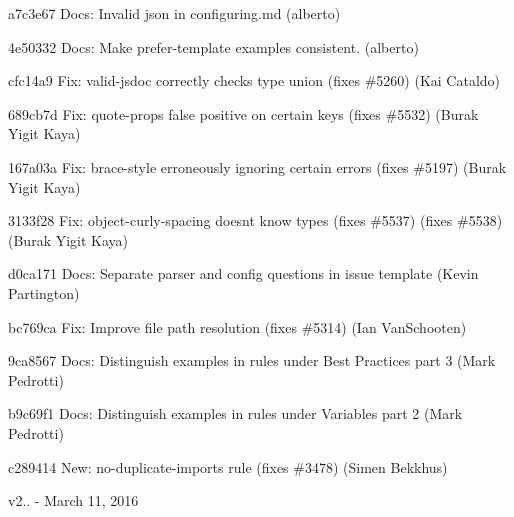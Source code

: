\begin{DoxyItemize}
\item a7c3e67 Docs\+: Invalid json in {\ttfamily configuring.\+md} (alberto)
\item 4e50332 Docs\+: Make {\ttfamily prefer-\/template} examples consistent. (alberto)
\item cfc14a9 Fix\+: valid-\/jsdoc correctly checks type union (fixes \#5260) (Kai Cataldo)
\item 689cb7d Fix\+: {\ttfamily quote-\/props} false positive on certain keys (fixes \#5532) (Burak Yigit Kaya)
\item 167a03a Fix\+: {\ttfamily brace-\/style} erroneously ignoring certain errors (fixes \#5197) (Burak Yigit Kaya)
\item 3133f28 Fix\+: object-\/curly-\/spacing doesn\textquotesingle{}t know types (fixes \#5537) (fixes \#5538) (Burak Yigit Kaya)
\item d0ca171 Docs\+: Separate parser and config questions in issue template (Kevin Partington)
\item bc769ca Fix\+: Improve file path resolution (fixes \#5314) (Ian Van\+Schooten)
\item 9ca8567 Docs\+: Distinguish examples in rules under Best Practices part 3 (Mark Pedrotti)
\item b9c69f1 Docs\+: Distinguish examples in rules under Variables part 2 (Mark Pedrotti)
\item c289414 New\+: {\ttfamily no-\/duplicate-\/imports} rule (fixes \#3478) (Simen Bekkhus)
\end{DoxyItemize}

v2.. -\/ March 11, 2016


